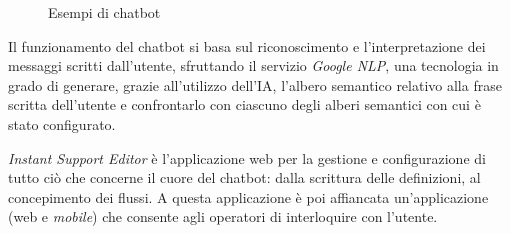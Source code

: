 \begin{figure}
    \centering
    \qquad
    \caption{Esempi di chatbot}
    \label{fig:chatbot-types}
\end{figure}

Il funzionamento del chatbot si basa sul riconoscimento e l'interpretazione dei messaggi scritti dall'utente, sfruttando il servizio \textit{Google NLP}, una tecnologia in grado di generare, grazie all'utilizzo dell'IA, l'albero semantico relativo alla frase scritta dell'utente e confrontarlo con ciascuno degli alberi semantici con cui è stato configurato.

\textit{Instant Support Editor} è l'applicazione web per la gestione e configurazione di tutto ciò che concerne il cuore del chatbot: dalla scrittura delle definizioni, al concepimento dei flussi.
%
A questa applicazione è poi affiancata un'applicazione (web e \textit{mobile}) che consente agli operatori di interloquire con l'utente.

